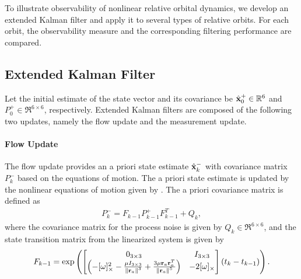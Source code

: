 To illustrate observability of nonlinear relative orbital dynamics, we develop an extended Kalman
filter and apply it to several types of relative orbits. For each orbit, the observability measure and the corresponding filtering performance are compared. 

\subsection{Extended Kalman Filter}

Let the initial estimate of the state vector and its covariance be $\hat {\mathbf{x}}_0^+\in\mathbb{R}^6$ and $P^+_0\in\Re^{6\times 6}$, respectively. Extended Kalman filters are composed of the following two updates, namely the flow update and the measurement update. 

\paragraph{Flow Update}
The flow update provides an a priori state estimate $\hat {\mathbf{x}}^-_k$ with covariance matrix $P^-_k$ based on the equations of motion. The a priori state estimate is updated by the nonlinear equations of motion given by . The a priori covariance matrix is defined as
\begin{align}
P^-_k=F_{k-1}P^+_{k-1}F_{k-1}^T+Q_k,
\end{align}
where the covariance matrix for the process noise is given by $Q_k\in\Re^{6\times 6}$, and the state transition matrix from the linearized system is given by
\begin{align}
F_{k-1}=\exp\left(
\begin{bmatrix}
0_{3\times3} & I_{3\times3} \\
\left(-[\omega]_\times^2-\frac{\mu I_{3\times3}}{\left\| \mathbf{r}_a \right\|^3}+\frac{3\mu \mathbf{r}_a \mathbf{r}_a^T}{\left\| \mathbf{r}_a \right\|^5}\right) & -2[\omega]_\times
\end{bmatrix}
(t_k-t_{k-1})\right).
\end{align}

